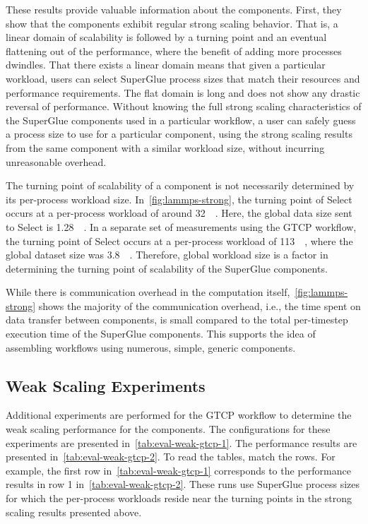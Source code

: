 These results provide valuable information about the components.
First, they show that the components exhibit regular strong
scaling behavior. That is, 
a linear domain of scalability is followed by a turning point and an
eventual flattening out of the performance, where the benefit
of adding more processes dwindles.
That there exists a linear domain means that given
a particular workload, users can select SuperGlue process sizes
that match their resources and performance requirements.
The flat domain is long and does not show any drastic reversal
of performance. Without knowing the full strong
scaling characteristics of the SuperGlue components used in a particular workflow,
a user can safely guess a process size to use for a particular component,
using the strong scaling results from the same component with a similar
workload size, without incurring unreasonable overhead.

The turning point of scalability of a component
is not necessarily determined by
its per-process workload size.
In~\autoref{fig:lammps-strong}, the turning point of Select
occurs at a per-process workload of around \SI{32}{\mega\byte}.
Here, the global data size sent to Select
is \SI{1.28}{\giga\byte}.
In a separate set of measurements using the GTCP workflow,
the turning point of Select occurs at a per-process workload
of \SI{113}{\mega\byte}, where the global dataset size
was \SI{3.8}{\giga\byte}. Therefore, global workload size
is a factor in determining the turning point of scalability
of the SuperGlue components.

While there is communication overhead in the computation itself,~\autoref{fig:lammps-strong} shows the majority of the communication
overhead, i.e., the time spent on data transfer between components,
is small compared to the total per-timestep execution time of
the SuperGlue components. This supports the idea
of assembling workflows using numerous, simple,
generic components.

\subsection{Weak Scaling Experiments}

Additional experiments are performed for the GTCP workflow to determine the
weak scaling performance for the components. The configurations for these experiments
are presented in~\autoref{tab:eval-weak-gtcp-1}. The performance results are
presented in~\autoref{tab:eval-weak-gtcp-2}. To read the tables, match the
rows. For example, the first row in~\autoref{tab:eval-weak-gtcp-1} corresponds
to the performance results in row 1 in~\autoref{tab:eval-weak-gtcp-2}.
These runs use SuperGlue process sizes for which the per-process
workloads reside near the turning points in the
strong scaling results presented above.

